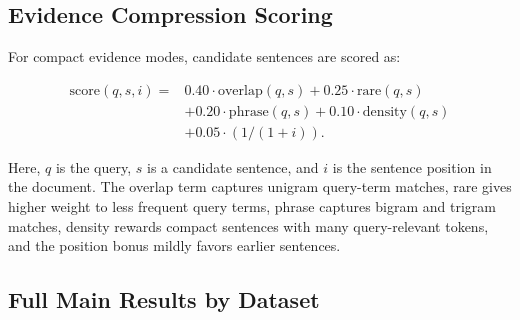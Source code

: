 \documentclass[11pt]{article}
\begin{document}
\subsection{Evidence Compression Scoring}
\label{app:evidence-scoring}

For compact evidence modes, candidate sentences are scored as:

\begin{equation}
\begin{split}
\mathrm{score}(q,s,i) ={}& 0.40 \cdot \mathrm{overlap}(q,s)
+ 0.25 \cdot \mathrm{rare}(q,s) \\
&+ 0.20 \cdot \mathrm{phrase}(q,s)
+ 0.10 \cdot \mathrm{density}(q,s) \\
&+ 0.05 \cdot (1 / (1 + i)).
\end{split}
\end{equation}

Here, $q$ is the query, $s$ is a candidate sentence, and $i$ is the sentence position in the document. The overlap term captures unigram query-term matches, rare gives higher weight to less frequent query terms, phrase captures bigram and trigram matches, density rewards compact sentences with many query-relevant tokens, and the position bonus mildly favors earlier sentences.

\subsection{Full Main Results by Dataset}
\label{app:full-main-results}
\end{document}
